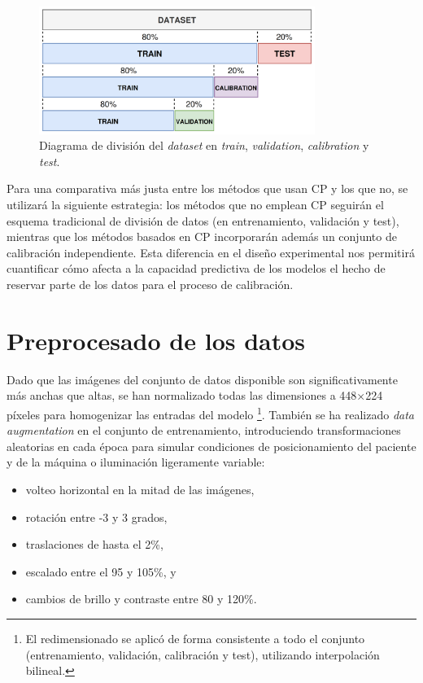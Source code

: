 \begin{figure}[h]
    \centering
    \includegraphics[width=0.8\textwidth]{capitulos/cap_04/imagenes/data_split_conformal.png}
    \caption[
        Diagrama de división del \textit{dataset} en \textit{train}, \textit{validation}, \textit{calibration} y \textit{test}.
    ]{
        Diagrama de división del \textit{dataset} en \textit{train}, \textit{validation}, \textit{calibration} y \textit{test}. 
    } 
    \label{fig:data_split_conformal}
\end{figure}

Para una comparativa más justa entre los métodos que usan CP y los que no, se utilizará la siguiente estrategia: los métodos que no emplean CP seguirán el esquema tradicional de división de datos (en entrenamiento, validación y test), mientras que los métodos basados en CP incorporarán además un conjunto de calibración independiente. Esta diferencia en el diseño experimental nos permitirá cuantificar cómo afecta a la capacidad predictiva de los modelos el hecho de reservar parte de los datos para el proceso de calibración.


\section{Preprocesado de los datos}

Dado que las imágenes del conjunto de datos disponible son significativamente más anchas que altas, se han normalizado todas las dimensiones a 448×224 píxeles para homogenizar las entradas del modelo%
\footnote{
    El redimensionado se aplicó de forma consistente a todo el conjunto (entrenamiento, validación, calibración y test), utilizando interpolación bilineal.
}.
También se ha realizado \textit{data augmentation} en el conjunto de entrenamiento, introduciendo
transformaciones aleatorias en cada época para simular condiciones de posicionamiento del paciente y de la 
máquina o iluminación ligeramente variable:
\begin{itemize}
    \item volteo horizontal en la mitad de las imágenes,
    \item rotación entre -3 y 3 grados,
    \item traslaciones de hasta el 2\%,
    \item escalado entre el 95 y 105\%, y
    \item cambios de brillo y contraste entre 80 y 120\%. 
\end{itemize}

